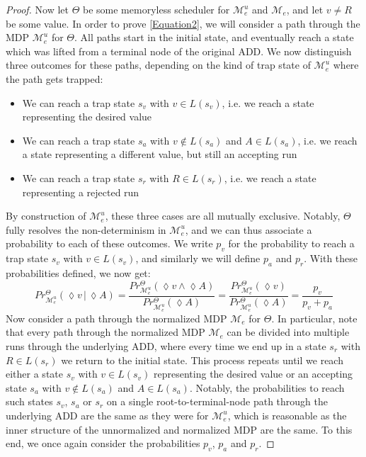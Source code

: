\begin{proof}
	Now let $\Theta$ be some memoryless scheduler for $\mathcal{M}^u_e$ and $\mathcal{M}_e$, and let $v \neq R$ be some value.
	In order to prove \ref{Equation2}, we will consider a path through the MDP $\mathcal{M}^u_e$ for $\Theta$.
	All paths start in the initial state, and eventually reach a state which was lifted from a terminal node of the original ADD. 
	We now distinguish three outcomes for these paths, depending on the kind of trap state of $\mathcal{M}^u_e$ where the path gets trapped:
	\begin{itemize}
		\item We can reach a trap state $s_v$ with $v \in L(s_v)$, i.e. we reach a state representing the desired value
		\item We can reach a trap state $s_a$ with $v \notin L(s_a)$ and $A \in L(s_a)$, i.e. we reach a state representing a different value, but still an accepting run
		\item We can reach a trap state $s_r$ with $R \in L(s_r)$, i.e. we reach a state representing a rejected run
	\end{itemize}
	By construction of $\mathcal{M}^u_e$, these three cases are all mutually exclusive.
	Notably, $\Theta$ fully resolves the non-determinism in $\mathcal{M}^u_e$, and we can thus associate a probability to each of these outcomes.
	We write $p_{v}$ for the probability to reach a trap state $s_v$ with $v \in L(s_v)$, and similarly we will define $p_{a}$ and $p_{r}$.
	With these probabilities defined, we now get:
	$$ Pr^{\Theta }_{\mathcal{M}^u_e} (\lozenge v \,|\, \lozenge A) 
	= \frac{Pr^{\Theta }_{\mathcal{M}^u_e} (\lozenge v \land \lozenge A)}{Pr^{\Theta }_{\mathcal{M}^u_e} ( \lozenge A)} 
	= \frac{Pr^{\Theta }_{\mathcal{M}^u_e} (\lozenge v)}{Pr^{\Theta }_{\mathcal{M}^u_e} ( \lozenge A)} 
	= \frac{p_{v}}{p_{v} + p_a}$$
	Now consider a path through the normalized MDP $\mathcal{M}_e$ for $\Theta$.
	In particular, note that every path through the normalized MDP $\mathcal{M}_e$ can be divided into multiple runs through the underlying ADD, where every time we end up in a state $s_r$ with $R \in L(s_r)$ we return to the initial state.
	This process repeats until we reach either a state $s_v$ with $v \in L(s_v)$ representing the desired value or an accepting state $s_a$ with $v \notin L(s_a)$ and $A \in L(s_a)$.
	Notably, the probabilities to reach such states $s_v$, $s_a$ or $s_r$ on a single root-to-terminal-node path through the underlying ADD are the same as they were for $\mathcal{M}^u_e$, which is reasonable as the inner structure of the unnormalized and normalized MDP are the same.
	To this end, we once again consider the probabilities $p_{v}$, $p_{a}$ and $p_{r}$.
	

\end{proof}
